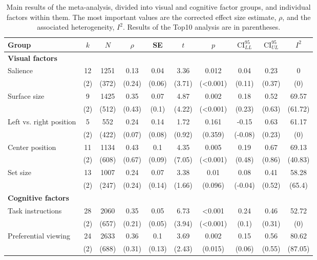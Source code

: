 \begin{table}[ht]
\centering
\caption{Main results of the meta-analysis, divided into visual and cognitive factor groups, and individual factors within them. The most important values are the corrected effect size estimate, $\rho$, and the associated heterogeneity, $I^2$. 
                Results of the Top10 analysis are in parentheses.} 
\label{tab:main_results}
\begingroup\small
\begin{tabular}{lccccccccc}
  \hline
Group & $k$ & $N$ & $\rho$ & SE & $t$ & $p$ & $\textrm{CI}^{95}_{LL}$ & $\textrm{CI}^{95}_{UL}$ & $I^2$ \\ 
  \hline
\textbf{Visual factors} &  &  &  &  &  &  &  &  &  \\ 
  Salience & 12 & 1251 & 0.13 & 0.04 & 3.36 & 0.012 & 0.04 & 0.23 & 0 \\ 
   & (2) & (372) & (0.24) & (0.06) & (3.71) & (<0.001) & (0.11) & (0.37) & (0) \\ 
  Surface size & 9 & 1425 & 0.35 & 0.07 & 4.87 & 0.002 & 0.18 & 0.52 & 69.57 \\ 
   & (2) & (512) & (0.43) & (0.1) & (4.22) & (<0.001) & (0.23) & (0.63) & (61.72) \\ 
  Left vs. right position & 5 & 552 & 0.24 & 0.14 & 1.72 & 0.161 & -0.15 & 0.63 & 61.17 \\ 
   & (2) & (422) & (0.07) & (0.08) & (0.92) & (0.359) & (-0.08) & (0.23) & (0) \\ 
  Center position & 11 & 1134 & 0.43 & 0.1 & 4.35 & 0.005 & 0.19 & 0.67 & 69.13 \\ 
   & (2) & (608) & (0.67) & (0.09) & (7.05) & (<0.001) & (0.48) & (0.86) & (40.83) \\ 
  Set size & 13 & 1007 & 0.24 & 0.07 & 3.38 & 0.01 & 0.08 & 0.41 & 58.28 \\ 
   & (2) & (247) & (0.24) & (0.14) & (1.66) & (0.096) & (-0.04) & (0.52) & (65.4) \\ 
  \textbf{Cognitive factors} &  &  &  &  &  &  &  &  &  \\ 
  Task instructions & 28 & 2060 & 0.35 & 0.05 & 6.73 & <0.001 & 0.24 & 0.46 & 52.72 \\ 
   & (2) & (657) & (0.21) & (0.05) & (3.94) & (<0.001) & (0.1) & (0.31) & (0) \\ 
  Preferential viewing & 24 & 2633 & 0.36 & 0.1 & 3.69 & 0.002 & 0.15 & 0.56 & 80.62 \\ 
   & (2) & (688) & (0.31) & (0.13) & (2.43) & (0.015) & (0.06) & (0.55) & (87.05) \\ 

\end{tabular}
\end{table}
